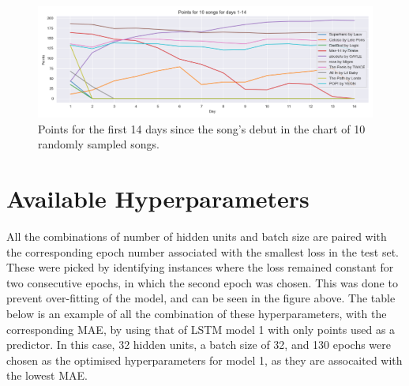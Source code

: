 \documentclass{article}
\begin{document}
\begin{figure}[H]
    \begin{adjustwidth}{-2cm}{-2cm}
    \centering
    \includegraphics[width=1\linewidth]{figures/10_song_points.png}
    \caption*{Points for the first 14 days since the song's debut in the chart of 10 randomly sampled songs.}
    \label{fig:10_songs}
    \end{adjustwidth}
\end{figure}

\section{Available Hyperparameters}\label{B}

All the combinations of number of hidden units and batch size are paired with the corresponding epoch number associated with the smallest loss in the test set. These were picked by identifying instances where the loss remained constant for two consecutive epochs, in which the second epoch was chosen. This was done to prevent over-fitting of the model, and can be seen in the figure above. The table below is an example of all the combination of these hyperparameters, with the corresponding MAE, by using that of LSTM model 1 with only points used as a predictor. In this case, 32 hidden units, a batch size of 32, and 130 epochs were chosen as the optimised hyperparameters for model 1, as they are assocaited with the lowest MAE.
\end{document}

